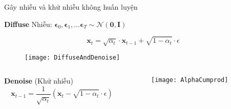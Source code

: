 
\begin{frame}{Gây nhiễu và khử nhiễu không huấn luyện}
    
    \textbf{Diffuse} Nhiễu:  $\boldsymbol{\epsilon}_{0}, \boldsymbol{\epsilon}_{1}, \dots \boldsymbol{\epsilon}_{T} \sim \mathcal{N}(\mathbf{0}, \mathbf{I})$
    
    
    
    \begin{equation}
        \mathbf{x}_t=\sqrt{\alpha_t} \cdot \mathbf{x}_{t-1}+\sqrt{1 - \alpha_t} \cdot \epsilon
    \end{equation}
    \vspace{-15pt}
    
    \begin{figure}
        \centering
        \texttt{[image: DiffuseAndDenoise]}
    \end{figure}
    
    \begin{columns}
        \begin{column}{0.5\textwidth}
        	\vspace{-10pt}
            \textbf{Denoise} (Khử nhiễu)
            \begin{equation}
                \mathbf{x}_{t-1} = \frac{1}{\sqrt{\alpha_{t}}} (\mathbf{x}_t - \sqrt{1- \alpha_t} \cdot \epsilon)
            \end{equation}
        \end{column}
        \begin{column}{0.5\textwidth}
        \begin{figure}
            \centering
			\texttt{[image: AlphaCumprod]}
        \end{figure}
        \end{column}
    \end{columns}
    
    \end{frame}
